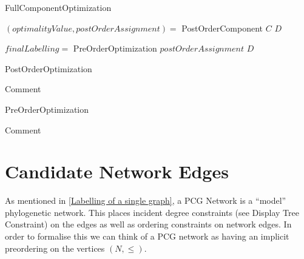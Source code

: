 \documentclass[11pt]{article}
\begin{document}
	\begin{algorithm}
		\caption{FullComponentOptimization}
		\label{alg:FullComponentOpt}
		\SetAlgoLined
		$(optimalityValue, postOrderAssignment) =$ PostOrderComponent $C$ $D$
		
		$finalLabelling =$ PreOrderOptimization $postOrderAssignment$ $D$
	\end{algorithm}
	
	\begin{algorithm}
		\caption{PostOrderOptimization}
		\label{alg:PostOrderOptimization}
		\SetAlgoLined
		\KwData{Input data $D$}
		\KwResult{Blah}
		Comment 
	\end{algorithm}

	\begin{algorithm}
		\caption{PreOrderOptimization}
		\label{alg:PreOrderOptimization}
		\SetAlgoLined
		Comment 
	\end{algorithm}

\newpage 

\section{Candidate Network Edges}\label{Candidate Network Edges}
 As mentioned in \ref{Labelling of a single graph}, a PCG Network is a ``model'' phylogenetic network.
 This places incident degree constraints (see Display Tree Constraint) on the edges as well as ordering constraints on network edges.
 In order to formalise this we can think of a PCG network as having an implicit preordering  on the vertices $(N, \leq )$. 


\vspace{2mm}
\begin{center}
\noindent{}
\end{center}
\end{document}
